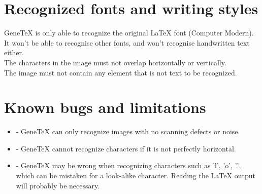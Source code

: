 \documentclass[12pt]{article}
\begin{document}
\section{Recognized fonts and writing styles}

GeneTeX is only able to recognize the original LaTeX font (Computer Modern).\\
It won't be able to recognise other fonts, and won't recognise handwritten text either.\\
The characters in the image must not overlap horizontally or vertically.\\
The image must not contain any element that is not text to be recognized.

\section{Known bugs and limitations}

\begin{itemize}
  \item[] - GeneTeX can only recognize images with no scanning defects or noise.
  \item[] - GeneTeX cannot recognize characters if it is not perfectly horizontal.
  \item[] - GeneTeX may be wrong when recognizing characters such as 'l', 'o', '.', which can be mistaken for a look-alike character. Reading the LaTeX output will probably be necessary.
\end{itemize}
\end{document}
